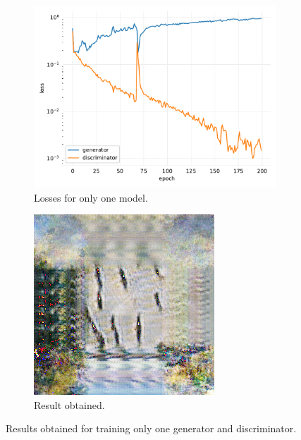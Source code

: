 \documentclass[twocolumn,superscriptaddress,aps,floatfix, nofootinbib]{revtex4-1}
\begin{document}
    \begin{figure}[H]
        \centering
        \begin{subfigure}[b]{0.22\textwidth}
            \centering
            \includegraphics[width=\textwidth]{resources/png/gan-losses/one1.pdf}
            \caption{Losses for only one model.}
        \end{subfigure}
        \hfill
        \begin{subfigure}[b]{0.22\textwidth}
            \centering
            \includegraphics[width=\textwidth]{resources/png/gan-results/test_one.png}
            \caption{Result obtained.}
            \label{fig:one1}
        \end{subfigure}
        \caption{Results obtained for training only one generator and discriminator.}
    \end{figure}
    
\end{document}
